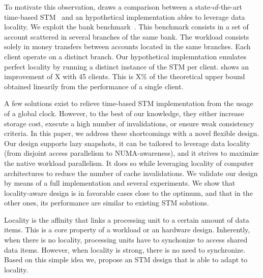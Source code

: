 To motivate this observation,  draws a comparison between a state-of-the-art time-based STM~\cite{FelberFMR10} and an hypothetical implementation ables to leverage data locality.
We exploit the bank benchmark~\cite{felber2010deuce}. 
This benchmark consists in a set of account scattered in several branches of the same bank.
The workload consists solely in money transfers between accounts located in the same branches.
Each client operate on a distinct branch.
Our hypothetical implemntation emulates perfect locality by running a distinct instance of the STM per client.
 shows an improvement of X with 45 clients.
This is X\% of the theoretical upper bound obtained linearily from the performance of a single client.

A few solutions exist to relieve time-based STM implementation from the usage of a global clock.
However, to the best of our knowledge, they either increase storage cost, execute a high number of invalidations, or ensure weak consistency criteria.
In this paper, we address these shortcomings with a novel flexible design.
Our design supports lazy snapshots, it can be tailored to leverage data locality (from disjoint access parallelism to NUMA-awareness), and it strives to maximize the native workload parallelism. 
It does so while leveraging locality of computer architectures to reduce the number of cache invalidations.
We validate our design by means of a full implementation and several experiments. 
We show that locality-aware design is in favorable cases close to the optimum,
and that in the other ones, its performance are similar to existing STM solutions.

Locality is the affinity that links a processing unit to a certain amount of data items.
This is a core property of a workload or an hardware design.
Inherently, when there is no locality, processing units have to synchonize to access shared data items.
However, when locality is strong, there is no need to synchronize.
Based on this simple idea we, propose an STM design that is able to adapt to locality.

